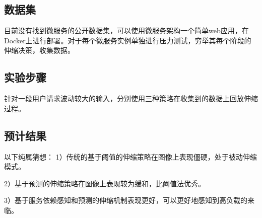 \documentclass[10.5pt,twocolumn]{jbuaa}
\begin{document}
\subsection{数据集}
目前没有找到微服务的公开数据集，可以使用微服务架构一个简单web应用，在Docker上进行部署。对于每个微服务实例单独进行压力测试，穷举其每个阶段的伸缩决策，收集数据。
\subsection{实验步骤}
针对一段用户请求波动较大的输入，分别使用三种策略在收集到的数据上回放伸缩过程。
\subsection{预计结果}
以下纯属猜想：
1）传统的基于阈值的伸缩策略在图像上表现僵硬，处于被动伸缩模式。

2）基于预测的伸缩策略在图像上表现较为缓和，比阈值法优秀\cite{li2016load}。

3）基于服务依赖感知和预测的伸缩机制表现更好，可以更好地感知到高负载的来临。




\renewcommand\refname{\hei\wuhao\centerline{参考文献}\global\def\refname{参考文献}}
\vskip 12pt

\let\OLDthebibliography\thebibliography
\renewcommand\thebibliography[1]{
  \OLDthebibliography{#1}
  \setlength{\parskip}{0pt}
  \setlength{\itemsep}{0pt plus 0.3ex}
}

{
\renewcommand{\baselinestretch}{0.9}
\liuhao


}
\end{document}
